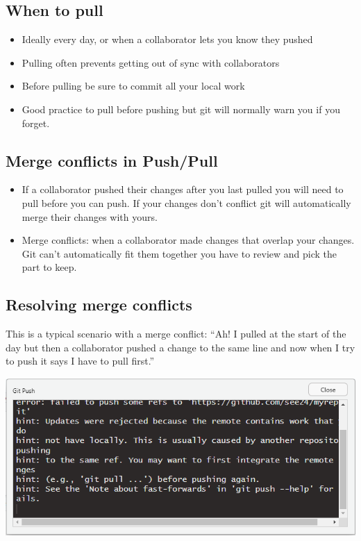 \documentclass[
  letterpaper,
  DIV=11,
  numbers=noendperiod]{scrreprt}
\providecommand{\tightlist}{%
  \setlength{\itemsep}{0pt}\setlength{\parskip}{0pt}}\usepackage{longtable,booktabs,array}
\begin{document}
\hypertarget{when-to-pull}{%
\subsection{When to pull}\label{when-to-pull}}

\begin{itemize}
\tightlist
\item
  Ideally every day, or when a collaborator lets you know they pushed
\item
  Pulling often prevents getting out of sync with collaborators
\item
  Before pulling be sure to commit all your local work
\item
  Good practice to pull before pushing but git will normally warn you if
  you forget.
\end{itemize}

\hypertarget{merge-conflicts-in-pushpull}{%
\subsection{Merge conflicts in
Push/Pull}\label{merge-conflicts-in-pushpull}}

\begin{itemize}
\tightlist
\item
  If a collaborator pushed their changes after you last pulled you will
  need to pull before you can push. If your changes don't conflict git
  will automatically merge their changes with yours.
\item
  Merge conflicts: when a collaborator made changes that overlap your
  changes. Git can't automatically fit them together you have to review
  and pick the part to keep.
\end{itemize}

\hypertarget{resolving-merge-conflicts}{%
\subsection{Resolving merge conflicts}\label{resolving-merge-conflicts}}

This is a typical scenario with a merge conflict: ``Ah! I pulled at the
start of the day but then a collaborator pushed a change to the same
line and now when I try to push it says I have to pull first.''

\includegraphics{assets/img/push_fail.PNG}
\end{document}
